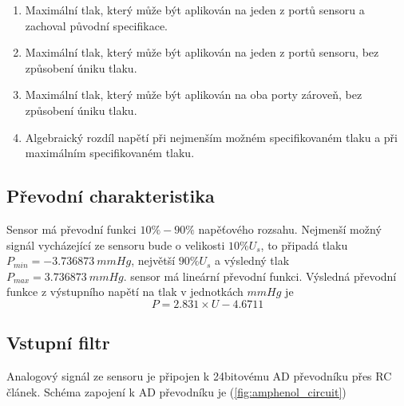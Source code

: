 \begin{table}[H]
\begin{ctucolortab}
    \end{ctucolortab}
    \begin{enumerate}
        \item \label{enum:amp_proof_pressure} Maximální tlak, který může být aplikován na jeden z portů sensoru a zachoval původní specifikace.
        \item \label{enum:amp_burst_pressure} Maximální tlak, který může být aplikován na jeden z portů sensoru, bez způsobení úniku tlaku.
        \item \label{enum:amp_common_pressure} Maximální tlak, který může být aplikován na oba porty zároveň, bez způsobení úniku tlaku.
        \item \label{enum:amp_fss} Algebraický rozdíl napětí při nejmenším možném specifikovaném tlaku a při maximálním specifikovaném tlaku.
    \end{enumerate}
\end{table}
\subsection{Převodní charakteristika}
Sensor má převodní funkci $10 \% - 90 \%$ napěťového rozsahu. Nejmenší možný signál vycházející ze sensoru bude o velikosti $10\% U_s$,
to připadá tlaku $P_{min} = -3.736873 \ mmHg$, největší $90\% U_s$ a výsledný tlak $P_{max} = 3.736873 \ mmHg$. sensor má lineární převodní funkci.
Výsledná převodní funkce z výstupního napětí na tlak v jednotkách $mmHg$ je
\begin{equation}
    P = 2.831 \times U - 4.6711
\end{equation}
\subsection{Vstupní filtr}
Analogový signál ze sensoru je připojen k 24bitovému AD převodníku přes RC článek. Schéma zapojení k AD převodníku je (\ref{fig:amphenol_circuit})

